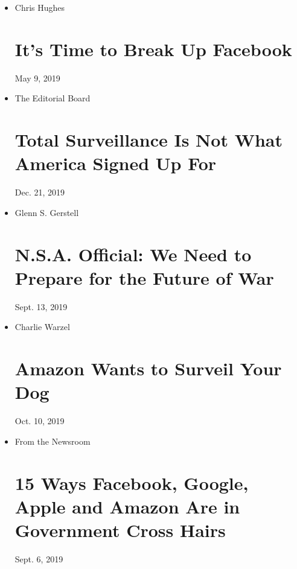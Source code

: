 \begin{itemize}
\item
  Chris Hughes

  \href{https://www.nytimes.com/2019/05/09/opinion/sunday/chris-hughes-facebook-zuckerberg.html}{}

  \hypertarget{its-time-to-break-up-facebook}{%
  \section{It's Time to Break Up
  Facebook}\label{its-time-to-break-up-facebook}}

  May 9, 2019
\item
  The Editorial Board

  \href{}{}

  \hypertarget{total-surveillance-is-not-what-america-signed-up-for}{%
  \section{Total Surveillance Is Not What America Signed Up
  For}\label{total-surveillance-is-not-what-america-signed-up-for}}

  Dec. 21, 2019
\item
  Glenn S. Gerstell

  \href{https://www.nytimes.com/2019/09/10/opinion/nsa-privacy.html}{}

  \hypertarget{nsa-official-we-need-to-prepare-for-the-future-of-war}{%
  \section{N.S.A. Official: We Need to Prepare for the Future of
  War}\label{nsa-official-we-need-to-prepare-for-the-future-of-war}}

  Sept. 13, 2019
\item
  Charlie Warzel

  \href{https://www.nytimes.com/2019/10/01/opinion/amazon-privacy.html}{}

  \hypertarget{amazon-wants-to-surveil-your-dog}{%
  \section{Amazon Wants to Surveil Your
  Dog}\label{amazon-wants-to-surveil-your-dog}}

  Oct. 10, 2019
\item
  From the Newsroom

  \href{https://www.nytimes.com/interactive/2019/technology/tech-investigations.html}{}

  \hypertarget{15-ways-facebook-google-apple-and-amazon-are-in-government-cross-hairs}{%
  \section{15 Ways Facebook, Google, Apple and Amazon Are in Government
  Cross
  Hairs}\label{15-ways-facebook-google-apple-and-amazon-are-in-government-cross-hairs}}

  Sept. 6, 2019
\end{itemize}

